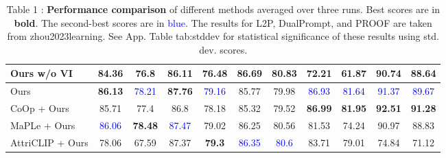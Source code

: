 \documentclass[varwidth=598pt]{standalone}
\begin{document}
\begin{table}
\begin{adjustbox}{max width=\textwidth}
\begin{tabular}{lcccccccccc}
Ours w/o VI & 84.36 & 76.8 & 86.11 & 76.48 & \textbf{86.69} & \textbf{80.83} & 72.21 & 61.87 & 90.74 & 88.64   \\  

\midrule
Ours  & \textbf{86.13} & \textcolor{blue}{78.21} & \textbf{87.76}  & \textcolor{blue}{79.16} & 85.77 & 79.98 & \textcolor{blue}{86.93} & \textcolor{blue}{81.64}  & \textcolor{blue}{91.37} & \textcolor{blue}{89.67} \\
CoOp + Ours  & 85.71  & 77.4 & 86.8& 78.18& 85.32 & 79.52  & \textbf{86.99} & \textbf{81.95} & \textbf{92.51} & \textbf{91.28}  \\

MaPLe + Ours & \textcolor{blue}{86.06} & \textbf{78.48} & \textcolor{blue}{87.47} & 79.02 & 86.25 & 80.56 & 81.53 & 74.24 & 90.97 & 88.83 \\

AttriCLIP + Ours  & 78.06 & 67.59 &  87.37 & \textbf{79.3} & \textcolor{blue}{86.35} & \textcolor{blue}{80.6}  & 83.71 & 79.01 & 74.84 & 71.12 \\


\bottomrule
\end{tabular}
\end{adjustbox}
\caption{Table 1 : \textbf{Performance comparison} of different methods averaged over three runs. Best scores are in \textbf{bold}. The second-best scores are in \textcolor{blue}{blue}. The results for L2P, DualPrompt, and PROOF are taken from zhou2023learning. See App. Table tab:stddev for statistical significance of these results using std. dev. scores.}
\end{table}
\end{document}
